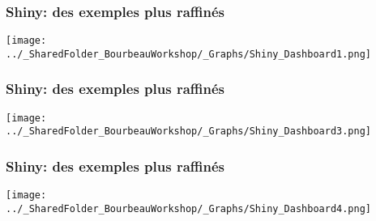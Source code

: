 \documentclass{beamer}
\begin{document}
    

    \begin{frame}
    
      \frametitle{Shiny: des exemples plus raffinés} \vspace{1cm}
      
        \begin{center}
      	  \texttt{[image: ../\_SharedFolder\_BourbeauWorkshop/\_Graphs/Shiny\_Dashboard1.png]}
        \end{center} 
      
          
    \end{frame}  
    

    
    

    \begin{frame}
    
      \frametitle{Shiny: des exemples plus raffinés} \vspace{1cm}
      
        \begin{center}
      	  \texttt{[image: ../\_SharedFolder\_BourbeauWorkshop/\_Graphs/Shiny\_Dashboard3.png]}
        \end{center} 
      
          
    \end{frame}  
    
    

    \begin{frame}
    
      \frametitle{Shiny: des exemples plus raffinés} \vspace{1cm}
      
        \begin{center}
      	  \texttt{[image: ../\_SharedFolder\_BourbeauWorkshop/\_Graphs/Shiny\_Dashboard4.png]}
        \end{center} 
      
          
    \end{frame}  
    
\end{document}
